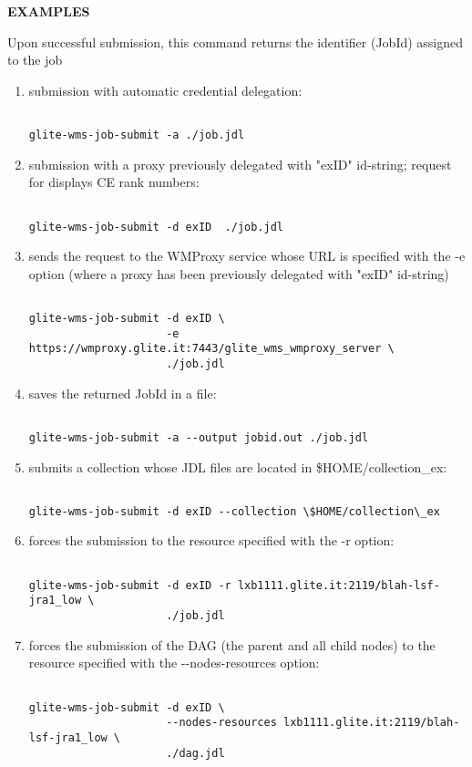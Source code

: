\medskip
\textbf{EXAMPLES}
\smallskip

Upon successful submission, this command returns the identifier (JobId) assigned to the job


\begin{enumerate}


\item  submission with automatic credential delegation:
\begin{verbatim}

glite-wms-job-submit -a ./job.jdl
\end{verbatim}


\item  submission with a proxy previously delegated with "exID" id-string; request for displays CE rank numbers:
\begin{verbatim}

glite-wms-job-submit -d exID  ./job.jdl
\end{verbatim}


\item  sends the request to the WMProxy service whose URL is specified with the -e option  (where a proxy has been previously delegated with "exID" id-string)
\begin{verbatim}

glite-wms-job-submit -d exID \
                     -e https://wmproxy.glite.it:7443/glite_wms_wmproxy_server \
                     ./job.jdl
\end{verbatim}


\item  saves the returned JobId in a file:
\begin{verbatim}

glite-wms-job-submit -a --output jobid.out ./job.jdl
\end{verbatim}


\item  submits a collection whose JDL files are located in \$HOME/collection\_ex:
\begin{verbatim}

glite-wms-job-submit -d exID --collection \$HOME/collection\_ex
\end{verbatim}


\item  forces the submission to the resource specified with the -r option:
\begin{verbatim}

glite-wms-job-submit -d exID -r lxb1111.glite.it:2119/blah-lsf-jra1_low \
                     ./job.jdl
\end{verbatim}


\item  forces the submission of the DAG (the parent and all child nodes) to the resource specified with the -{}-nodes-resources option:
\begin{verbatim}

glite-wms-job-submit -d exID \
                     --nodes-resources lxb1111.glite.it:2119/blah-lsf-jra1_low \
                     ./dag.jdl
\end{verbatim}

\end{enumerate}


